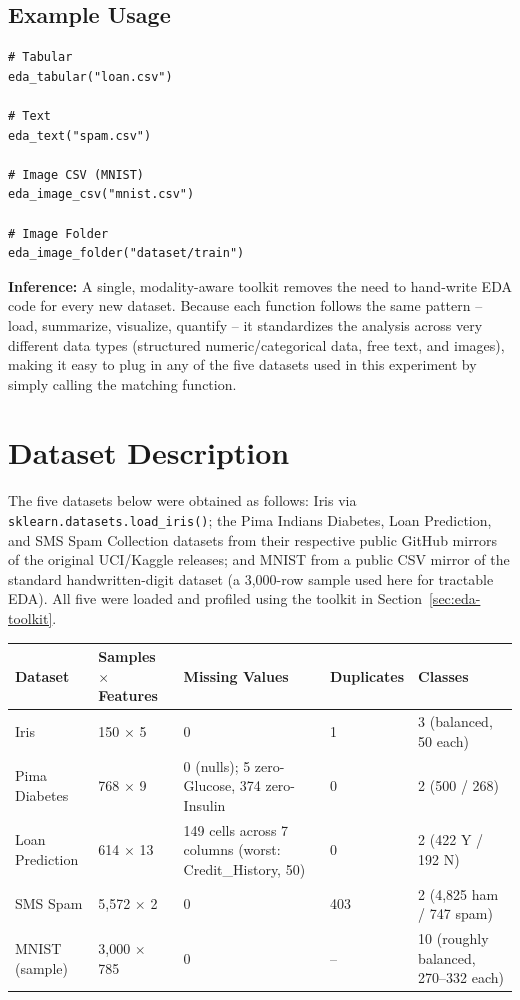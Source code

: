 \documentclass[12pt,a4paper]{article}
\begin{document}
\subsection{Example Usage}
\begin{lstlisting}
# Tabular
eda_tabular("loan.csv")

# Text
eda_text("spam.csv")

# Image CSV (MNIST)
eda_image_csv("mnist.csv")

# Image Folder
eda_image_folder("dataset/train")
\end{lstlisting}

\textbf{Inference:} A single, modality-aware toolkit removes the need to hand-write EDA code
for every new dataset. Because each function follows the same pattern -- load, summarize,
visualize, quantify -- it standardizes the analysis across very different data types
(structured numeric/categorical data, free text, and images), making it easy to plug in any
of the five datasets used in this experiment by simply calling the matching function.

\section{Dataset Description}
The five datasets below were obtained as follows: Iris via \texttt{sklearn.datasets.load\_iris()};
the Pima Indians Diabetes, Loan Prediction, and SMS Spam Collection datasets from their
respective public GitHub mirrors of the original UCI/Kaggle releases; and MNIST from a public
CSV mirror of the standard handwritten-digit dataset (a 3,000-row sample used here for
tractable EDA). All five were loaded and profiled using the toolkit in Section~\ref{sec:eda-toolkit}.

\begin{longtable}{|p{3.6cm}|p{2.6cm}|p{2.6cm}|p{2.5cm}|p{2.5cm}|}
\hline
\textbf{Dataset} & \textbf{Samples $\times$ Features} & \textbf{Missing Values} & \textbf{Duplicates} & \textbf{Classes} \\ \hline
\endhead
Iris & 150 $\times$ 5 & 0 & 1 & 3 (balanced, 50 each) \\ \hline
Pima Diabetes & 768 $\times$ 9 & 0 (nulls); 5 zero-Glucose, 374 zero-Insulin & 0 & 2 (500 / 268) \\ \hline
Loan Prediction & 614 $\times$ 13 & 149 cells across 7 columns (worst: Credit\_History, 50) & 0 & 2 (422 Y / 192 N) \\ \hline
SMS Spam & 5,572 $\times$ 2 & 0 & 403 & 2 (4,825 ham / 747 spam) \\ \hline
MNIST (sample) & 3,000 $\times$ 785 & 0 & -- & 10 (roughly balanced, 270--332 each) \\ \hline
\end{longtable}
\end{document}
